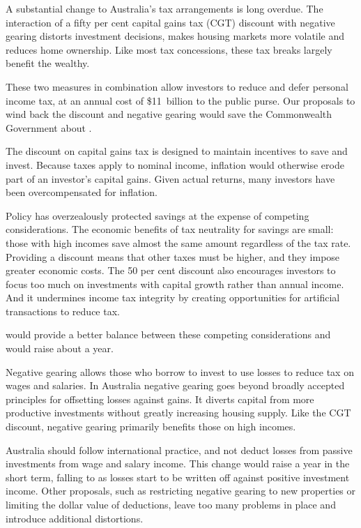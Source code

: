 \documentclass{grattan}\usepackage[]{graphicx}\usepackage[]{color}
\begin{document}
\newlength{\overviewextra}
\setlength{\overviewextra}{-2pt}
\addtolength{\columnsep}{\overviewextra}
\begin{overview}[-25pt] %
A substantial change to Australia's tax arrangements is long overdue. The interaction of a fifty per cent capital gains tax (CGT) discount with negative gearing distorts investment decisions, makes housing markets more volatile and reduces home ownership. Like most tax concessions, these tax breaks largely benefit the wealthy.

These two measures in combination allow investors to reduce and defer personal income tax, at an annual cost of \$11~billion to the public purse. Our proposals to wind back the discount and negative gearing would save the Commonwealth Government about . 

The discount on capital gains tax is designed to maintain incentives to save and invest.  Because taxes apply to nominal income, inflation would otherwise erode part of an investor's capital gains. Given actual returns, many investors have been overcompensated for inflation. 

Policy has overzealously protected savings at the expense of competing considerations. The economic benefits of tax neutrality for savings are small: those with high incomes save almost the same amount regardless of the tax rate. Providing a discount means that other taxes must be higher, and they impose greater economic costs. The 50 per cent discount also encourages investors to focus too much on investments with capital growth rather than annual income. And it undermines income tax integrity by creating opportunities for artificial transactions to reduce tax. 

 would provide a better balance between these competing considerations and would raise about  a year.

Negative gearing allows those who borrow to invest to use losses to reduce tax on wages and salaries. In Australia negative gearing goes beyond broadly accepted principles for offsetting losses against gains. It diverts capital from more productive investments without greatly increasing housing supply. Like the CGT discount, negative gearing primarily benefits those on high incomes.

Australia should follow international practice, and not deduct losses from passive investments from wage and salary income.  This change would raise  a year in the short term, falling to  as losses start to be written off against positive investment income. Other proposals, such as restricting negative gearing to new properties or limiting the dollar value of deductions, leave too many problems in place and introduce additional distortions. 


\end{overview}
\end{document}
